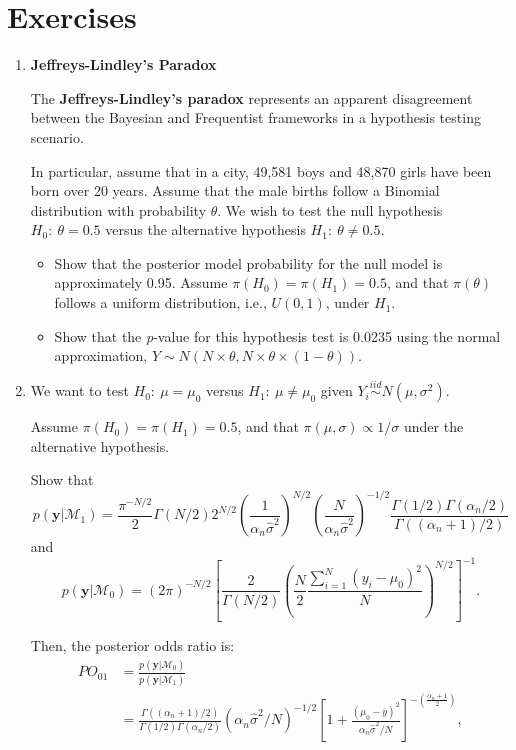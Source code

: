 \section{Exercises}\label{sec28}
\begin{enumerate}
	\item \textbf{Jeffreys-Lindley's Paradox}
	
	The \textbf{Jeffreys-Lindley's paradox} \cite{Jeffreys1961,lindley1957statistical} represents an apparent disagreement between the Bayesian and Frequentist frameworks in a hypothesis testing scenario.
	
	In particular, assume that in a city, 49,581 boys and 48,870 girls have been born over 20 years. Assume that the male births follow a Binomial distribution with probability $\theta$. We wish to test the null hypothesis $H_0: \ \theta = 0.5$ versus the alternative hypothesis $H_1: \ \theta \neq 0.5$.
	
	\begin{itemize}
		\item Show that the posterior model probability for the null model is approximately 0.95. Assume $\pi(H_0) = \pi(H_1) = 0.5$, and that $\pi(\theta)$ follows a uniform distribution, i.e., ${U}(0,1)$, under $H_1$.
		\item Show that the \textit{p}-value for this hypothesis test is 0.0235 using the normal approximation, $Y \sim N(N \times \theta, N \times \theta \times (1 - \theta))$.
	\end{itemize}
	
	\item We want to test $H_0: \ \mu = \mu_0$ versus $H_1: \ \mu \neq \mu_0$ given $Y_i \stackrel{iid}{\sim} N(\mu, \sigma^2)$.
	
	Assume $\pi(H_0) = \pi(H_1) = 0.5$, and that $\pi(\mu, \sigma) \propto 1/\sigma$ under the alternative hypothesis.
	
	Show that	
	\[
	p(\mathbf{y}|\mathcal{M}_1) = \frac{\pi^{-N/2}}{2} \Gamma(N/2) 2^{N/2} \left( \frac{1}{\alpha_n \hat{\sigma}^2} \right)^{N/2} \left( \frac{N}{\alpha_n \hat{\sigma}^2} \right)^{-1/2} \frac{\Gamma(1/2) \Gamma(\alpha_n/2)}{\Gamma((\alpha_n+1)/2)}
	\]
	and 
	\[
	p(\mathbf{y}|\mathcal{M}_0) = (2\pi)^{-N/2} \left[ \frac{2}{\Gamma(N/2)} \left( \frac{N}{2} \frac{\sum_{i=1}^N (y_i - \mu_0)^2}{N} \right)^{N/2} \right]^{-1}.
	\]
	
	Then, the posterior odds ratio is:	
	\begin{align*}
		PO_{01} &= \frac{p(\mathbf{y}|\mathcal{M}_0)}{p(\mathbf{y}|\mathcal{M}_1)} \\
		&= \frac{\Gamma((\alpha_n+1)/2)}{\Gamma(1/2)\Gamma(\alpha_n/2)} (\alpha_n \hat{\sigma}^2 / N)^{-1/2} \left[ 1 + \frac{(\mu_0 - \bar{y})^2}{\alpha_n \hat{\sigma}^2 / N} \right]^{-\left(\frac{\alpha_n + 1}{2}\right)},
	\end{align*}
	

\end{enumerate}
